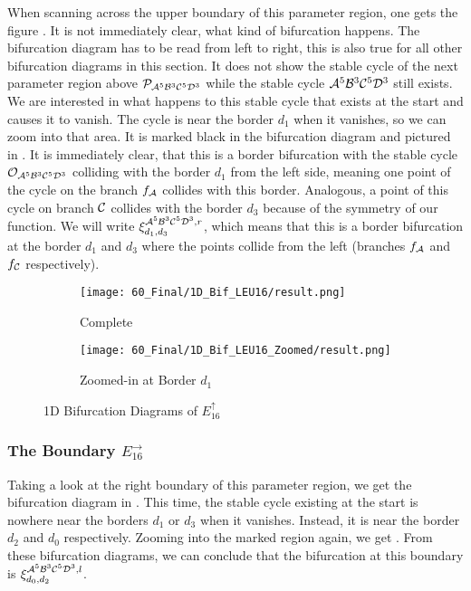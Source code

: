 When scanning across the upper boundary of this parameter region, one gets the figure .
It is not immediately clear, what kind of bifurcation happens.
The bifurcation diagram has to be read from left to right, this is also true for all other bifurcation diagrams in this section.
It does not show the stable cycle of the next parameter region above $\mathcal{P}_{\mathcal{A}^5\mathcal{B}^3\mathcal{C}^5\mathcal{D}^3}$ while the stable cycle $\mathcal{A}^5\mathcal{B}^3\mathcal{C}^5\mathcal{D}^3$ still exists.
We are interested in what happens to this stable cycle that exists at the start and causes it to vanish.
The cycle is near the border $d_1$ when it vanishes, so we can zoom into that area.
It is marked black in the bifurcation diagram and pictured in .
It is immediately clear, that this is a border bifurcation with the stable cycle $\mathcal{O}_{\mathcal{A}^5\mathcal{B}^3\mathcal{C}^5\mathcal{D}^3}$ colliding with the border $d_1$ from the left side, meaning one point of the cycle on the branch $f_{\mathcal{A}}$ collides with this border.
Analogous, a point of this cycle on branch $\mathcal{C}$ collides with the border $d_3$ because of the symmetry of our function.
We will write $\xi_{d_1, d_3}^{\mathcal{A}^5\mathcal{B}^3\mathcal{C}^5\mathcal{D}^3, r}$, which means that this is a border bifurcation at the border $d_1$ and $d_3$ where the points collide from the left (branches $f_{\mathcal{A}}$ and $f_{\mathcal{C}}$ respectively).

\begin{figure}
    \centering
    \begin{subfigure}{0.4\textwidth}
        \centering
        \texttt{[image: 60\_Final/1D\_Bif\_LEU16/result.png]}
        \caption{Complete}
        \label{fig:final.bifurcation.E.up}
    \end{subfigure}
    \begin{subfigure}{0.4\textwidth}
        \centering
        \texttt{[image: 60\_Final/1D\_Bif\_LEU16\_Zoomed/result.png]}
        \caption{Zoomed-in at Border $d_1$}
        \label{fig:bifurcation.E.up.zoomed}
    \end{subfigure}
    \caption{1D Bifurcation Diagrams of $E_{16}^\uparrow$}
\end{figure}

\subsubsection{The Boundary $E_{16}^\rightarrow$}

Taking a look at the right boundary of this parameter region, we get the bifurcation diagram in .
This time, the stable cycle existing at the start is nowhere near the borders $d_1$ or $d_3$ when it vanishes.
Instead, it is near the border $d_2$ and $d_0$ respectively.
Zooming into the marked region again, we get .
From these bifurcation diagrams, we can conclude that the bifurcation at this boundary is $\xi_{d_0, d_2}^{\mathcal{A}^5\mathcal{B}^3\mathcal{C}^5\mathcal{D}^3, l}$.

